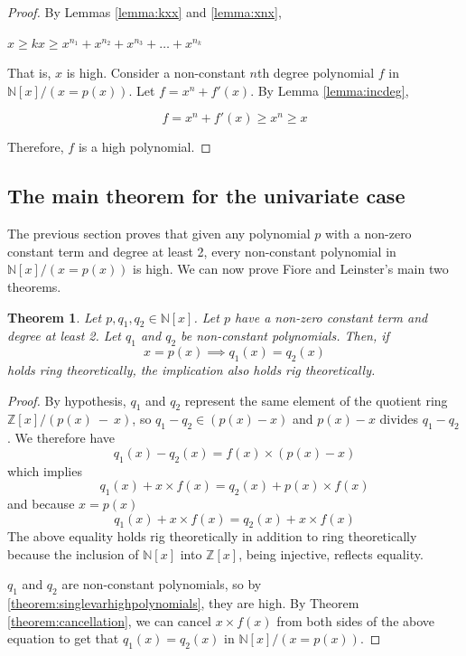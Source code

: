 \documentclass{msthesis}
\newtheorem{theorem}{Theorem}[section]
\theoremstyle{definition}
\newcommand{\ints}{\mathbb{Z}}
\newcommand{\nat}{\mathbb{N}}
\begin{document}
\begin{proof}
    By Lemmas \ref{lemma:kxx} and \ref{lemma:xnx},

    $x \ge kx \ge x^{n_1} + x^{n_2} + x^{n_3} + \dots + x^{n_k}$

    That is, $x$ is high.  Consider a non-constant $n$th degree polynomial $f$ in $\nat[x]/(x=p(x))$.  Let $f = x^n + f'(x)$. By Lemma \ref{lemma:incdeg},

    \[ f = x^n + f'(x) \ge x^n \ge x\]

    Therefore, $f$ is a high polynomial.
\end{proof}

\subsection{The main theorem for the univariate case}

The previous section proves that given any polynomial $p$ with a non-zero constant term and degree at least 2, every non-constant polynomial in $\nat[x]/(x = p(x))$ is high.  We can now prove Fiore and Leinster's main two theorems.

\begin{theorem}\label{theorem:ringtorig}
    Let $p, q_1, q_2 \in \nat[x]$.  Let $p$ have a non-zero constant term and degree at least 2.  Let $q_1$ and $q_2$ be non-constant polynomials.  Then, if
    \[ x = p(x) \implies q_1(x) = q_2(x)\]
    holds ring theoretically, the implication also holds rig theoretically. 
\end{theorem}
\begin{proof}
    By hypothesis, $q_1$ and $q_2$ represent the same element of the quotient ring $\ints[x]/(p(x)~-~x)$, so $q_1 - q_2 \in (p(x) - x)$ and $p(x) - x$ divides $q_1 - q_2$.  We therefore have
    \[q_1(x) - q_2(x) = f(x) \times (p(x) - x) \]
    which implies
    \[ q_1(x) + x \times f(x) = q_2(x) + p(x) \times f(x)\]
    and because $x = p(x)$
    \[ q_1(x) + x \times f(x) = q_2(x) + x \times f(x) \]
    The above equality holds rig theoretically in addition to ring theoretically because the inclusion of $\nat[x]$ into $\ints[x]$, being injective, reflects equality.

    $q_1$ and $q_2$ are non-constant polynomials, so by \ref{theorem:singlevarhighpolynomials}, they are high.  By Theorem \ref{theorem:cancellation}, we can cancel $x \times f(x)$ from both sides of the above equation to get that $q_1(x) = q_2(x)$ in $\nat[x]/(x = p(x))$.
\end{proof}
\end{document}
